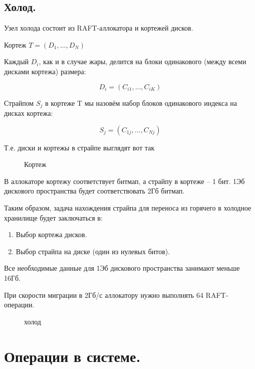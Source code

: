 \subsection{Холод.}\label{ux445ux43eux43bux43eux434.}

Узел холода состоит из RAFT-аллокатора и кортежей дисков.

Кортеж \(T = \left( D_1, \ldots, D_N \right)\)

Каждый \(D_i\), как и в случае жары, делится на блоки одинакового (между
всеми дисками кортежа) размера:

\[
D_i = \left(C_{i1}, \ldots, C_{iK}\right)
\]

Страйпом \(S_j\) в кортеже T мы назовём набор блоков одинакового индекса
на дисках кортежа:

\[
S_j = \left(C_{1j}, \ldots, C_{Nj} \right)
\]

Т.е. диски и кортежы в страйпе выглядят вот так

\begin{figure}
\centering
\pandocbounded{}
\caption{Кортеж}
\end{figure}

В аллокаторе кортежу соответствует битмап, а страйпу в кортеже -- 1 бит.
1Эб дискового пространства будет соответствовать 2Гб битмап.

Таким образом, задача нахождения страйпа для переноса из горячего в
холодное хранилище будет заключаться в:

\begin{enumerate}
\def\labelenumi{\arabic{enumi}.}
\tightlist
\item
  Выбор кортежа дисков.
\item
  Выбор страйпа на диске (один из нулевых битов).
\end{enumerate}

Все необходимые данные для 1Эб дискового пространства занимают меньше
16Гб.

При скорости миграции в 2Гб/с аллокатору нужно выполнять 64
RAFT-операции.

\begin{figure}
\centering
\pandocbounded{}
\caption{холод}
\end{figure}

\section{Операции в
системе.}\label{ux43eux43fux435ux440ux430ux446ux438ux438-ux432-ux441ux438ux441ux442ux435ux43cux435.}

